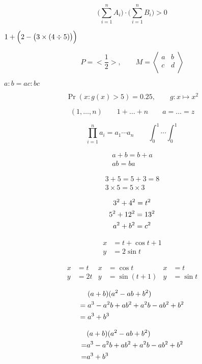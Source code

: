 \documentclass{ctexart}
\begin{document}
\[
\biggl( \sum_{i=1}^n A_i \biggr) \cdot
\biggl( \sum_{i=1}^n B_i \biggr) > 0
\]

$ 1 + \Bigl(2 - \bigl(3 \times (4 \div 5) \bigr) \Bigr) $

\[ P = \biggl< \frac12 \biggr>, \qquad
M = \left< \begin{matrix}
  a & b \\ c & d \\
  \end{matrix}\right> \]

$a:b=ac:bc$

\[
\Pr(x\colon g(x)>5) = 0.25,
\qquad g\colon x \mapsto x^2
\]

\[ (1,\dots,n) \qquad 1+\dots+n \qquad a=\dots=z \]

\[ \prod_{i=1}^n a_i = a_1 \dotsm a_n \qquad \int_0^1\dotsi\int_0^1 \]

\begin{gather}
  a+b=b+a\\
  ab=ba
\end{gather}

\begin{gather*}
  3+5=5+3=8\\
  3\times 5 = 5\times3
\end{gather*}

\begin{gather}
  3^2 + 4^2 = t^2\notag\\
  5^2 + 12^2 = 13^2\notag\\
  a^2 + b^2 = c^2
\end{gather}

\begin{align}
  x &= t + \cos t + 1\\
  y &= 2\sin t
\end{align}

\begin{align*}
  x &= t & x &= \cos t & x &= t\\
  y &= 2t & y &= \sin(t+1) & y &= \sin t
\end{align*}

\begin{align*}
    & (a+b)(a^2-ab+b^2) \notag \\
={} & a^3 - a^2b + ab^2 + a^2b
      - ab^2 + b^2 \notag \\
={} & a^3 + b^3
\end{align*}

\begin{align*}
    & (a+b)(a^2-ab+b^2) \notag \\
= & a^3 - a^2b + ab^2 + a^2b
      - ab^2 + b^2 \notag \\
= & a^3 + b^3
\end{align*}
\end{document}
